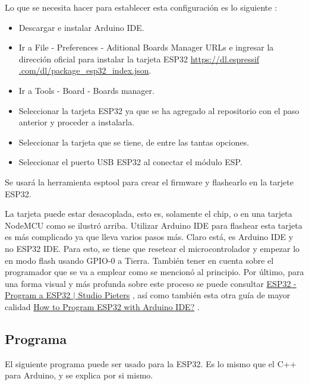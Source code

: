 \documentclass[conference]{IEEEtran}
\begin{document}
\bigbreak

Lo que se necesita hacer para establecer esta configuración es lo siguiente
\cite{pieters-2022}:

\begin{itemize}
\item Descargar e instalar Arduino IDE.

\item Ir a File - Preferences - Aditional Boards Manager URLs e ingresar la
dirección oficial para instalar la tarjeta ESP32 \url{https://dl.espressif
    .com/dl/package_esp32_index.json}.

\item Ir a Tools - Board - Boards manager.

\item Seleccionar la tarjeta ESP32 ya que se ha agregado al repositorio con
el paso anterior y proceder a instalarla.

\item Seleccionar la tarjeta que se tiene, de entre las tantas opciones.

\item Seleccionar el puerto USB ESP32 al conectar el módulo ESP.
\end{itemize}

Se usará la herramienta esptool para crear el firmware y flashearlo en la
tarjete ESP32.

\bigbreak

La tarjeta puede estar desacoplada, esto es, solamente el chip, o en una
tarjeta NodeMCU como se ilustró arriba. Utilizar Arduino IDE para flashear
esta tarjeta es más complicado ya que lleva varios pasos más. Claro está, es
Arduino IDE y no ESP32 IDE. Para esto, se tiene que resetear el
microcontrolador y empezar lo en modo flash usando GPIO-0 a Tierra. También
tener en cuenta sobre el programador que se va a emplear como se mencionó al
principio. Por último, para una forma visual y más profunda sobre este
proceso se puede consultar
\href{https://www.studiopieters.nl/esp32-program-a-esp32}{ESP32 - Program a ESP32 $\mid$ Studio Pieters}
\cite{pieters-2022}, así como también esta otra guía de mayor calidad
\href{https://www.electronicshub.org/esp32-arduino-ide}{How to Program ESP32 with Arduino IDE?} \cite{teja-2021}.

\subsection{Programa}

El siguiente programa puede ser usado para la ESP32. Es lo mismo que el C++
para Arduino, y se explica por si mismo.
\end{document}
